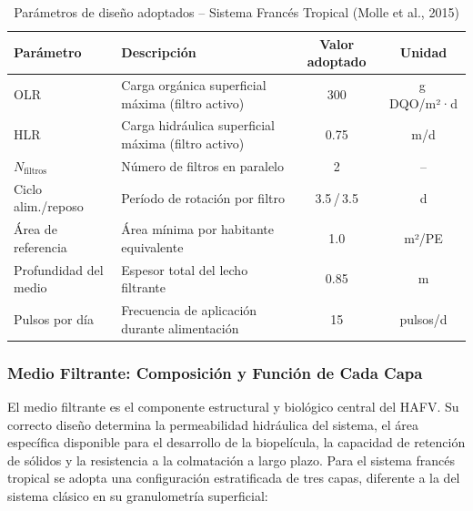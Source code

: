 \begin{table}[H]
\centering
\caption{Parámetros de diseño adoptados -- Sistema Francés Tropical (Molle et al., 2015)}
\label{tab:parametros_frances}
\begin{tabular}{p{5.0cm}p{5.2cm}cc}
\toprule
\textbf{Parámetro} & \textbf{Descripción} & \textbf{Valor adoptado} & \textbf{Unidad} \\
\midrule
OLR & Carga orgánica superficial máxima (filtro activo) & 300 & g\,DQO/m²·d \\
HLR & Carga hidráulica superficial máxima (filtro activo) & 0.75 & m/d \\
$N_\text{filtros}$ & Número de filtros en paralelo & 2 & -- \\
Ciclo alim./reposo & Período de rotación por filtro & 3.5\,/\,3.5 & d \\
Área de referencia & Área mínima por habitante equivalente & 1.0 & m²/PE \\
Profundidad del medio & Espesor total del lecho filtrante & 0.85 & m \\
Pulsos por día & Frecuencia de aplicación durante alimentación & 15 & pulsos/d \\
\bottomrule
\end{tabular}
\end{table}

\subsubsection*{Medio Filtrante: Composición y Función de Cada Capa}

El medio filtrante es el componente estructural y biológico central del HAFV. Su correcto diseño determina la permeabilidad hidráulica del sistema, el área específica disponible para el desarrollo de la biopelícula, la capacidad de retención de sólidos y la resistencia a la colmatación a largo plazo. Para el sistema francés tropical se adopta una configuración estratificada de tres capas, diferente a la del sistema clásico en su granulometría superficial:

